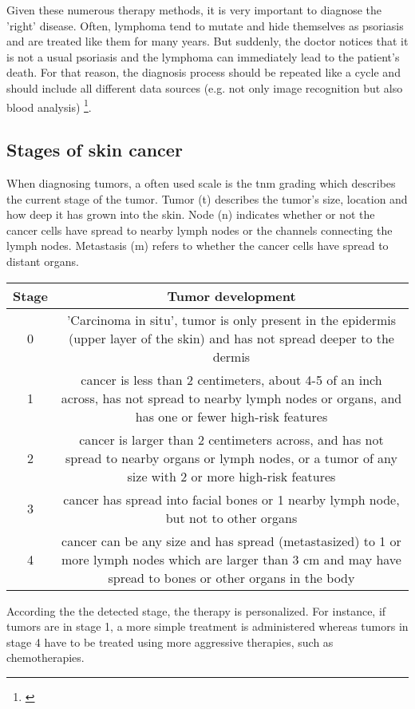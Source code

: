 Given these numerous therapy methods, it is very important to diagnose the 'right' disease. Often, lymphoma tend to mutate and hide themselves as psoriasis and are treated like them for many years. But suddenly, the doctor notices that it is not a usual psoriasis and the lymphoma can immediately lead to the patient's death. For that reason, the diagnosis process should be repeated like a cycle and should include all different data sources (e.g. not only image recognition but also blood analysis) \footnote{\cite{ndr_lymphom}}. 

\subsection{Stages of skin cancer}

When diagnosing tumors, a often used scale is the \ac{tnm} grading which describes the current stage of the tumor. 
Tumor (t) describes the tumor's size, location and how deep it has grown into the skin. Node (n) indicates whether or not the cancer cells have spread to nearby lymph nodes or the channels connecting the lymph nodes. Metastasis (m) refers to whether the cancer cells have spread to distant organs.

\begin{center}
 \begin{tabular}{|| c | c ||} 
 \hline
Stage & Tumor development \\ [0.5ex] 
\hline\hline
0 & 'Carcinoma in situ', tumor is only present in the epidermis (upper layer of the skin) and has not spread deeper to the dermis \\
\hline
1 & cancer is less than 2 centimeters, about 4-5 of an inch across, has not spread to nearby lymph nodes or organs, and has one or fewer high-risk features  \\
\hline
2 & cancer is larger than 2 centimeters across, and has not spread to nearby organs or lymph nodes, or a tumor of any size with 2 or more high-risk features \\
\hline
3 & cancer has spread into facial bones or 1 nearby lymph node, but not to other organs  \\
\hline
4 & cancer can be any size and has spread (metastasized) to 1 or more lymph nodes which are larger than 3 cm and may have spread to bones or other organs in the body \\
 \hline
\end{tabular}
\end{center}

According the the detected stage, the therapy is personalized. For instance, if tumors are in stage 1, a more simple treatment is administered whereas tumors in stage 4 have to be treated using more aggressive therapies, such as chemotherapies.   

